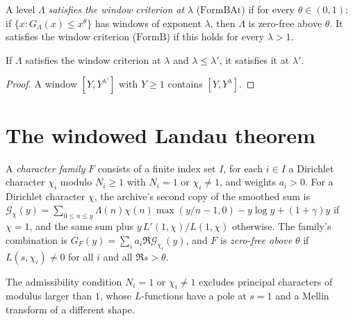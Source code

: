\begin{definition}\label{an:formb}
A level $\Lambda$ \emph{satisfies the window criterion at} $\lambda$
($\mathrm{FormBAt}$) if for every $\theta\in(0,1)$: if
$\{x: G_{\Lambda}(x)\le x^{\theta}\}$ has windows of exponent $\lambda$, then
$\Lambda$ is zero-free above $\theta$. It satisfies the window criterion
($\mathrm{FormB}$) if this holds for every $\lambda>1$.
\end{definition}

\begin{lemma}\label{an:formb-mono}
If $\Lambda$ satisfies the window criterion at $\lambda$ and
$\lambda\le\lambda'$, it satisfies it at $\lambda'$.
\end{lemma}
\begin{proof}
A window $[Y,Y^{\lambda'}]$ with $Y\ge1$ contains $[Y,Y^{\lambda}]$.
\end{proof}

\section{The windowed Landau theorem}

\begin{definition}\label{an:charfamily}
A \emph{character family} $F$ consists of a finite index set $I$, for
each $i\in I$ a Dirichlet character $\chi_i$ modulo $N_i\ge1$ with
$N_i=1$ or $\chi_i\ne1$, and weights $a_i>0$. For a Dirichlet character
$\chi$, the archive's second copy of the smoothed sum is
$\mathcal G_{\chi}(y)=\sum_{0\le n\le y}\Lambda(n)\chi(n)\max(y/n-1,0)-y\log
y+(1+\gamma)y$ if $\chi=1$, and the same sum plus $y\,L'(1,\chi)/L(1,\chi)$
otherwise. The family's combination is
$G_F(y)=\sum_i a_i\Re\mathcal G_{\chi_i}(y)$, and $F$ is \emph{zero-free
above} $\theta$ if $L(s,\chi_i)\ne0$ for all $i$ and all $\Re s>\theta$.
\end{definition}

\begin{remark}
The admissibility condition $N_i=1$ or $\chi_i\ne1$ excludes principal
characters of modulus larger than $1$, whose $L$-functions have a pole at
$s=1$ and a Mellin transform of a different shape.
\end{remark}

